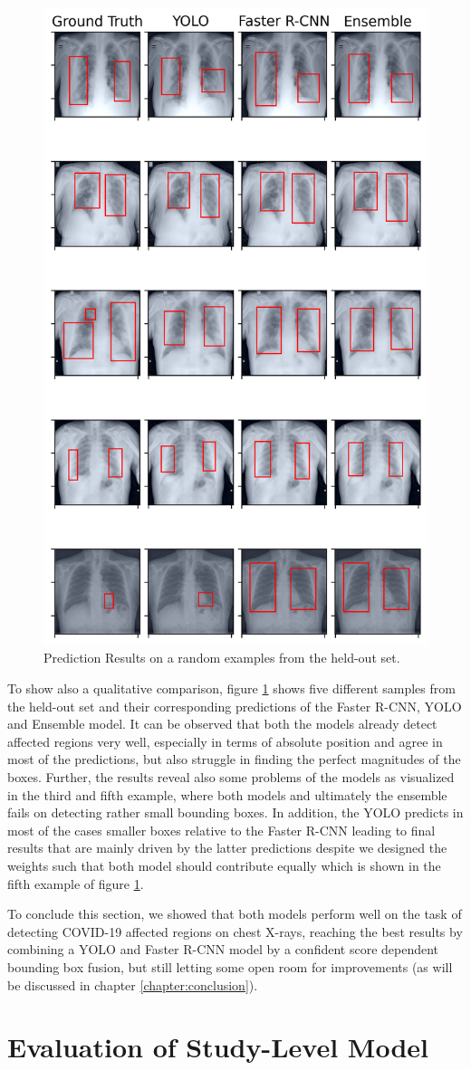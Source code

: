 \begin{figure}[h!]
	\centering
	\includegraphics[width=0.6\linewidth]{img/combo.png}
	\caption{Prediction Results on a random examples from the held-out set.}
	\label{fig:combo_eval}
\end{figure}
To show also a qualitative comparison, figure \ref{fig:combo_eval} shows five different samples from the held-out set and their corresponding predictions of the Faster \ac{R-CNN}, \ac{YOLO} and Ensemble model. It can be observed that both the models already detect affected regions very well, especially in terms of absolute position and agree in most of the predictions, but also struggle in finding the perfect magnitudes of the boxes. Further, the results reveal also some problems of the models as visualized in the third and fifth example, where both models and ultimately the ensemble fails on detecting rather small bounding boxes. In addition, the \ac{YOLO} predicts in most of the cases smaller boxes relative to the Faster \ac{R-CNN} leading to final results that are mainly driven by the latter predictions despite we designed the weights such that both model should contribute equally which is shown in the fifth example of figure \ref{fig:combo_eval}. 

To conclude this section, we showed that both models perform well on the task of detecting COVID-19 affected regions on chest X-rays, reaching the best results by combining a \ac{YOLO} and Faster \ac{R-CNN} model by a confident score dependent bounding box fusion, but still letting some open room for improvements (as will be discussed in chapter \ref{chapter:conclusion}).

\section{Evaluation of Study-Level Model}
